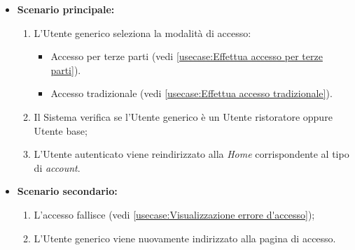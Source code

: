 \begin{itemize}
	\item \textbf{Scenario principale:}
	      \begin{enumerate}
		      \item L'Utente generico seleziona la modalità di accesso: 

			  \begin{itemize}
				\item Accesso per terze parti (vedi \autoref{usecase:Effettua accesso per terze parti}).
				\item Accesso tradizionale (vedi \autoref{usecase:Effettua accesso tradizionale}).
			  \end{itemize}

		      \item Il Sistema verifica se l'Utente generico è un Utente ristoratore oppure Utente base;
		      \item L'Utente autenticato viene reindirizzato alla \textit{Home} corrispondente al tipo di \textit{account}.
	      \end{enumerate}
		
	\item \textbf{Scenario secondario:}
		\begin{enumerate}
			\item L'accesso fallisce (vedi \autoref{usecase:Visualizzazione errore d'accesso});
			\item L'Utente generico viene nuovamente indirizzato alla pagina di accesso.
		\end{enumerate}	
	\end{itemize}
